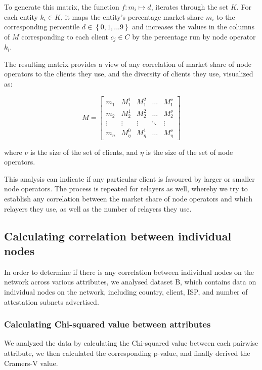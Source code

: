 \documentclass[conference]{IEEEtran}
\begin{document}
To generate this matrix, the function $f: m_i \mapsto d$, iterates through the set $K$. For each entity $k_i \in K$, it maps the entity's percentage market share $m_i$ to the corresponding percentile $d \in \left\{0, 1, ... 9\right\}$ and increases the values in the columns of $M$ corresponding to each client $c_j \in C$ by the percentage run by node operator $k_i$.

The resulting matrix provides a view of any correlation of market share of node operators to the clients they use, and the diversity of clients they use, visualized as:

\[
M = \begin{bmatrix}
m_1 & M_1^1 & M_1^2 & \ldots & M_1^{\nu} \\
m_2 & M_2^1 & M_2^2 & \ldots & M_2^{\nu} \\
\vdots & \vdots & \vdots & \ddots & \vdots \\
m_n & M_{\eta}^0 & M_{\eta}^1 & \ldots & M_{\eta}^{\nu}
\end{bmatrix}
\]

where $\nu$ is the size of the set of clients, and $\eta$ is the size of the set of node operators.

This analysis can indicate if any particular client is favoured by larger or smaller node operators. The process is repeated for relayers as well, whereby we try to establish any correlation between the market share of node operators and which relayers they use, as well as the number of relayers they use.

\subsection{Calculating correlation between individual nodes}
\label{sec:calculating-correlation-between-individual-nodes}

In order to determine if there is any correlation between individual nodes on the network across various attributes, we analysed dataset B, which contains data on individual nodes on the network, including country, client, ISP, and number of attestation subnets advertised.

\subsubsection{Calculating Chi-squared value between attributes}
\label{sec:calculating-chi-squared-value-between-attributes}

We analyzed the data by calculating the Chi-squared value between each pairwise attribute, we then calculated the corresponding p-value, and finally derived the Cramers-V value.
\end{document}
